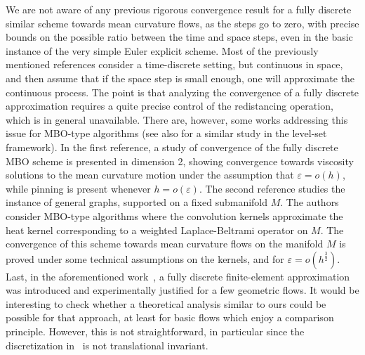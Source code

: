 \documentclass[10pt]{amsart}
\theoremstyle{plain}
\theoremstyle{definition}
\newcommand{\e}{\varepsilon}
\numberwithin{equation}{section}
\begin{document}
We are not aware of any previous rigorous convergence result for a fully discrete  similar
scheme towards  mean curvature flows, as the steps go to zero,
with precise bounds on the possible ratio between the time and space steps, even in the basic instance of the very simple Euler explicit scheme. 
Most of the previously mentioned references
consider a time-discrete setting, but continuous in
space, and then assume that if the space step is small enough, one will approximate the continuous process.
The point is that analyzing the convergence of a fully discrete
approximation requires a quite precise control
of the redistancing operation, which is in general unavailable.
There are, however, some works addressing this issue \cite{MisiastYip16, LauxLelmi23} for MBO-type algorithms (see also \cite{LauUll} for a similar study in the level-set framework). In the first reference, a study of convergence of the fully discrete MBO scheme is presented in dimension 2, showing  convergence  towards viscosity solutions to the mean curvature motion  under the assumption that $\e=o(h)$, while pinning is present whenever $h=o(\e)$. The second reference studies the instance of general graphs, supported on a fixed submanifold $M$. The authors consider MBO-type algorithms where the convolution kernels approximate
the heat kernel corresponding to a weighted Laplace-Beltrami operator on  $M$. The convergence of this scheme towards  mean curvature flows on the manifold $M$ is proved under some technical assumptions on the kernels, and for $\e = o(h^{\frac 32})$. 
Last, in the aforementioned work~\cite{KimNot}, a fully discrete
finite-element approximation was introduced
and experimentally justified for a few geometric flows. 
It would be interesting to check whether
a theoretical analysis similar to ours could  be possible for that approach, at least for basic flows
which enjoy a comparison principle. However, this is
not straightforward, in particular since the discretization
in~\cite{KimNot} is not translational invariant.
\end{document}
